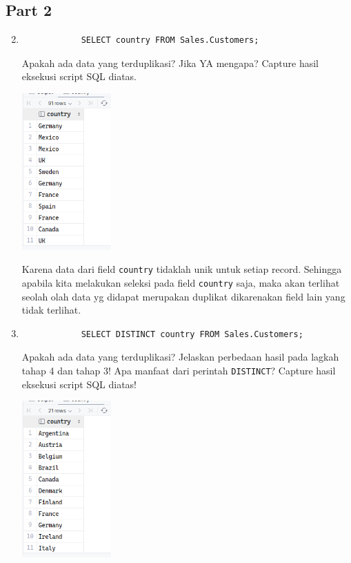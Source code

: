 \documentclass[12pt,titlepage]{article}
\begin{document}
\subsection{Part 2}
\begin{enumerate}
    \setcounter{enumi}{1}
    \item {
        \begin{verbatim}
            SELECT country FROM Sales.Customers;
        \end{verbatim}
        Apakah ada data yang terduplikasi? Jika YA mengapa? Capture hasil eksekusi script SQL diatas.

        \begin{center}
            \includegraphics[height=6cm]{./images/p2-n1.png}
        \end{center}

        Karena data dari field \texttt{country} tidaklah unik untuk setiap record. Sehingga apabila kita melakukan seleksi pada field \texttt{country} saja,
        maka akan terlihat seolah olah data yg didapat merupakan duplikat dikarenakan field lain yang tidak terlihat.
    }
    \item {
        \begin{verbatim}
            SELECT DISTINCT country FROM Sales.Customers;
        \end{verbatim}

        Apakah ada data yang terduplikasi? Jelaskan perbedaan hasil pada lagkah tahap 4 dan
        tahap 3! Apa manfaat dari perintah \texttt{DISTINCT}? Capture hasil eksekusi script SQL diatas!

        \begin{center}
            \includegraphics[height=6cm]{./images/p2-n2.png}
        \end{center}

}
\end{enumerate}
\end{document}
